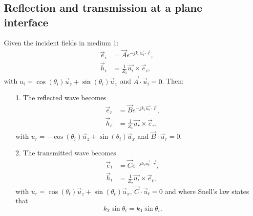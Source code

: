 \documentclass[a4paper, 10pt]{article}
\begin{document}
    \subsection{Reflection and transmission at a plane interface}
    Given the incident fields in medium 1:
    \begin{align}
        \vec{e}_i&=\vec{A}e^{-jk_1\vec{u_i}\cdot \vec{r}} \label{H5eq12},\\
        \vec{h}_i&=\frac{1}{Z_1}\vec{u_i}\times\vec{e}_i \label{H5eq13},
    \end{align}
    with $u_i = \cos(\theta_i)\vec{u}_z+\sin(\theta_i)\vec{u}_x$ and $\vec{A}\cdot \vec{u}_i = 0$. Then:
    \begin{itemize}
        \item[1.] The reflected wave becomes
        \begin{align}
            \vec{e}_r&=\vec{B}e^{-jk_1\vec{u_r}\cdot \vec{r}} \label{H5eq14},\\
            \vec{h}_r&=\frac{1}{Z_1}\vec{u_r}\times \vec{e}_r \label{H5eq15},
        \end{align}
        with $u_r = -\cos(\theta_i)\vec{u}_z+\sin(\theta_i)\vec{u}_x$ and $\vec{B}\cdot \vec{u}_r = 0$.
        \item[2.] The transmitted wave becomes
        \begin{align}
            \vec{e}_t&=\vec{C}e^{-jk_2\vec{u_t}\cdot \vec{r}} \label{H5eq16},\\
            \vec{h}_t&=\frac{1}{Z_2}\vec{u_t}\times \vec{e}_t \label{H5eq17},
        \end{align}
        with $u_r = \cos(\theta_t)\vec{u}_z+\sin(\theta_t)\vec{u}_x$, $\vec{C}\cdot \vec{u}_t = 0$ and where Snell's law states that
        \begin{equation}
            k_2\sin{\theta_t} = k_1\sin{\theta_i} \label{H5eq18}.
        \end{equation}
    \end{itemize}


 
\end{document}
